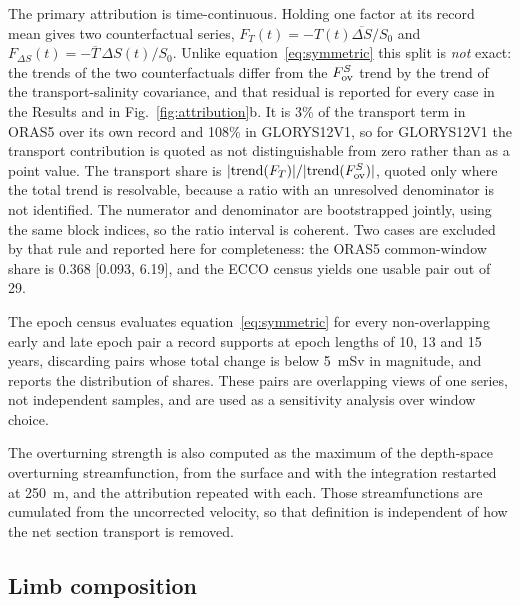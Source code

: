 The primary attribution is time-continuous. Holding one factor at its record
mean gives two counterfactual series, $F_T(t)=-T(t)\overline{\Delta S}/S_0$ and
$F_{\Delta S}(t)=-\overline{T}\,\Delta S(t)/S_0$. Unlike
equation~\eqref{eq:symmetric} this split is \emph{not} exact: the trends of the
two counterfactuals differ from the $F_{\mathrm{ov}}^{S}$ trend by the trend of the
transport-salinity covariance, and that residual is reported for every case in
the Results and in Fig.~\ref{fig:attribution}b. It is 3\% of the transport term
in ORAS5 over its own record and 108\% in GLORYS12V1, so for GLORYS12V1 the
transport contribution is quoted as not distinguishable from zero rather than as
a point value. The transport share is
$|{\rm trend}(F_T)|/|{\rm trend}(F_{\mathrm{ov}}^{S})|$, quoted only where the total trend is
resolvable, because a ratio with an unresolved denominator is not identified.
The numerator and denominator are bootstrapped jointly, using the same block
indices, so the ratio interval is coherent. Two cases are excluded by that rule
and reported here for completeness: the ORAS5 common-window share is 0.368
[0.093, 6.19], and the ECCO census yields one usable pair out of 29.

The epoch census evaluates equation~\eqref{eq:symmetric} for every
non-overlapping early and late epoch pair a record supports at epoch lengths of
10, 13 and 15 years, discarding pairs whose total change is below 5~mSv in
magnitude, and reports the distribution of shares. These pairs are overlapping
views of one series, not independent samples, and are used as a sensitivity
analysis over window choice.

The overturning strength is also computed as the maximum of the depth-space
overturning streamfunction, from the surface and with the integration restarted
at 250~m, and the attribution repeated with each. Those streamfunctions are
cumulated from the uncorrected velocity, so that definition is independent of
how the net section transport is removed.

\subsection*{Limb composition}

